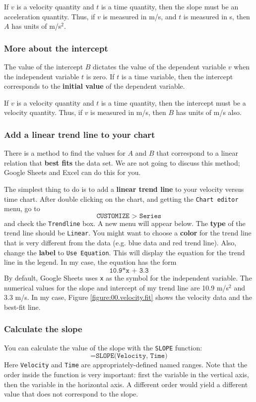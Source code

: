 If $v$ is a velocity quantity and $t$ is a time quantity, then the slope must be an acceleration quantity. Thus, if $v$ is measured in m/s, and $t$ is measured in s, then $A$ has units of m/s$^{2}$.
%
\subsubsection{More about the intercept}
%
The value of the intercept $B$ dictates the value of the dependent variable $v$ when the independent variable $t$ is zero. If $t$ is a time variable, then the intercept corresponds to the \textbf{initial value} of the dependent variable.

If $v$ is a velocity quantity and $t$ is a time quantity, then the intercept must be a velocity quantity. Thus, if $v$ is measured in m/s, then $B$ has units of m/s also.
%
\subsubsection{Add a linear trend line to your chart}
%
There is a method to find the values for $A$ and $B$ that correspond to a linear relation that \textbf{best fits} the data set. We are not going to discuss this method; Google Sheets and Excel can do this for you.

The simplest thing to do is to add a \textbf{linear trend line} to your velocity versus time chart. After double clicking on the chart, and getting the \texttt{Chart editor} menu, go to
\begin{equation}
    \texttt{CUSTOMIZE > Series}
\end{equation}
and check the \texttt{Trendline} box. A new menu will appear below. The \textbf{type} of the trend line should be \texttt{Linear}. You might want to choose a \textbf{color} for the trend line that is very different from the data (e.g. blue data and red trend line). Also, change the \textbf{label} to \texttt{Use Equation}. This will display the equation for the trend line in the legend. In my case, the equation has the form
\begin{equation}
    \texttt{10.9*x + 3.3}
\end{equation}
By default, Google Sheets uses \texttt{x} as the symbol for the independent variable. The numerical values for the slope and intercept of my trend line are 10.9 m/s$^{2}$ and 3.3 m/s. In my case, Figure \ref{figure:00.velocity.fit} shows the velocity data and the best-fit line.
%
\subsubsection{Calculate the slope}
%
You can calculate the value of the slope with the \texttt{SLOPE} function:
\begin{equation}
    \texttt{=SLOPE(Velocity, Time)}
\end{equation}
Here \texttt{Velocity} and \texttt{Time} are appropriately-defined named ranges. Note that the order inside the function is very important: first the variable in the vertical axis, then the variable in the horizontal axis. A different order would yield a different value that does not correspond to the slope.

